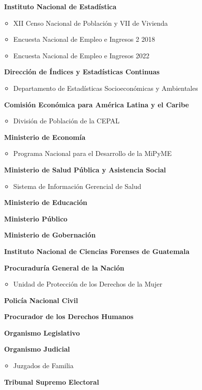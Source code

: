 \newpage
	\begin{itemize}
		\item[$ $] \textbf{Instituto Nacional de Estadística}
		\begin{itemize}
			\item	XII Censo Nacional de Población y VII de Vivienda 
			\item	Encuesta Nacional de Empleo e Ingresos 2 2018
			\item	Encuesta Nacional de Empleo e Ingresos 2022
		\end{itemize}
		\item[$ $] \textbf{Dirección de Índices y Estadísticas Continuas}
		\begin{itemize}
			\item	Departamento de Estadísticas Socioeconómicas y Ambientales
		\end{itemize}
		\item[$ $] \textbf{Comisión Económica para América Latina y el Caribe}
		\begin{itemize}
			\item	División de Población de la CEPAL
		\end{itemize}
		\item[$ $] \textbf{Ministerio de Economía}
		\begin{itemize}
			\item	Programa Nacional para el Desarrollo de la MiPyME
		\end{itemize}	
		\item[$ $] \textbf{Ministerio de Salud Pública y Asistencia Social}
		\begin{itemize}
			\item	Sistema de Información Gerencial de Salud		
		\end{itemize}
		\item[$ $] \textbf{Ministerio de Educación}
		\item[$ $] \textbf{Ministerio Público}
		\item[$ $] \textbf{Ministerio de Gobernación}
		\item[$ $] \textbf{Instituto Nacional de Ciencias Forenses de Guatemala}	
		\item[$ $] \textbf{Procuraduría General de la Nación}
		\begin{itemize}
			\item	 Unidad de Protección de los Derechos de la Mujer	
		\end{itemize}		
		\item[$ $] \textbf{Policía Nacional Civil}
		\item[$ $] \textbf{Procurador de los Derechos Humanos}
		\item[$ $] \textbf{Organismo Legislativo}		
		\item[$ $] \textbf{Organismo Judicial}					
		\begin{itemize}
			\item	 Juzgados de Familia	
		\end{itemize}
		\item[$ $] \textbf{Tribunal Supremo Electoral}					
	\end{itemize}
	
